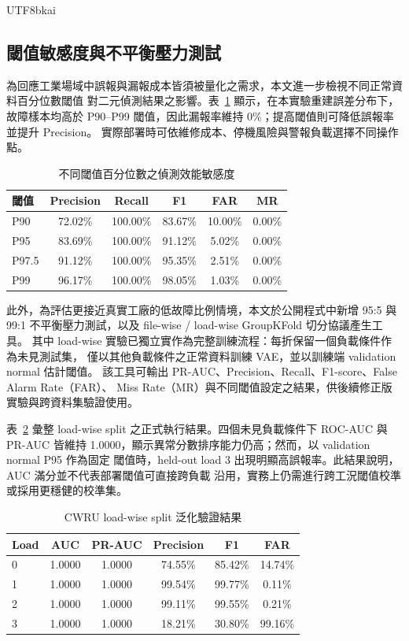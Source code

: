 \documentclass[conference]{IEEEtran}
\begin{document}
\begin{CJK}{UTF8}{bkai}
\subsection{閾值敏感度與不平衡壓力測試}

為回應工業場域中誤報與漏報成本皆須被量化之需求，本文進一步檢視不同正常資料百分位數閾值
對二元偵測結果之影響。表~\ref{tab:threshold_sensitivity} 顯示，在本實驗重建誤差分布下，
故障樣本均高於 P90--P99 閾值，因此漏報率維持 0\%；提高閾值則可降低誤報率並提升 Precision。
實際部署時可依維修成本、停機風險與警報負載選擇不同操作點。

\begin{table}[ht]
\centering
\caption{不同閾值百分位數之偵測效能敏感度}
\label{tab:threshold_sensitivity}
\begin{tabular}{lccccc}
\toprule
\textbf{閾值} & \textbf{Precision} & \textbf{Recall} & \textbf{F1} & \textbf{FAR} & \textbf{MR} \\
\midrule
P90  & 72.02\% & 100.00\% & 83.67\% & 10.00\% & 0.00\% \\
P95  & 83.69\% & 100.00\% & 91.12\% & 5.02\%  & 0.00\% \\
P97.5& 91.12\% & 100.00\% & 95.35\% & 2.51\%  & 0.00\% \\
P99  & 96.17\% & 100.00\% & 98.05\% & 1.03\%  & 0.00\% \\
\bottomrule
\end{tabular}
\end{table}

此外，為評估更接近真實工廠的低故障比例情境，本文於公開程式中新增
95:5 與 99:1 不平衡壓力測試，以及 file-wise / load-wise GroupKFold 切分協議產生工具。
其中 load-wise 實驗已獨立實作為完整訓練流程：每折保留一個負載條件作為未見測試集，
僅以其他負載條件之正常資料訓練 VAE，並以訓練端 validation normal 估計閾值。
該工具可輸出 PR-AUC、Precision、Recall、F1-score、False Alarm Rate（FAR）、
Miss Rate（MR）與不同閾值設定之結果，供後續修正版實驗與跨資料集驗證使用。

表~\ref{tab:loadwise} 彙整 load-wise split 之正式執行結果。四個未見負載條件下 ROC-AUC 與
PR-AUC 皆維持 1.0000，顯示異常分數排序能力仍高；然而，以 validation normal P95 作為固定
閾值時，held-out load 3 出現明顯高誤報率。此結果說明，AUC 滿分並不代表部署閾值可直接跨負載
沿用，實務上仍需進行跨工況閾值校準或採用更穩健的校準集。

\begin{table}[ht]
\centering
\caption{CWRU load-wise split 泛化驗證結果}
\label{tab:loadwise}
\begin{tabular}{lccccc}
\toprule
\textbf{Load} & \textbf{AUC} & \textbf{PR-AUC} & \textbf{Precision} & \textbf{F1} & \textbf{FAR} \\
\midrule
0 & 1.0000 & 1.0000 & 74.55\% & 85.42\% & 14.74\% \\
1 & 1.0000 & 1.0000 & 99.54\% & 99.77\% & 0.11\% \\
2 & 1.0000 & 1.0000 & 99.11\% & 99.55\% & 0.21\% \\
3 & 1.0000 & 1.0000 & 18.21\% & 30.80\% & 99.16\% \\
\bottomrule
\end{tabular}
\end{table}


\end{CJK}
\end{document}
